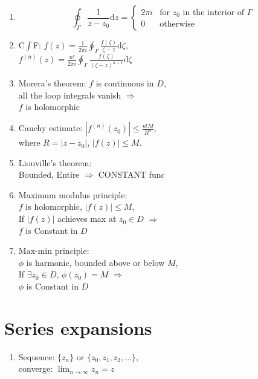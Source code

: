 \documentclass[11pt,a4paper]{article}
\begin{document}
\begin{multicols}{2}
\begin{enumerate}[resume]
\item \[
\oint_{\Gamma} \frac{1}{z-z_0} \mathrm{d}z = 
\begin{cases}
2 \pi i &\text{for } z_0 \text{ in the interior of } \Gamma \\
0 &\text{otherwise}
\end{cases}
\]

\item C$\int$F: $\displaystyle f(z) = \frac{1}{2 \pi i} \oint_{\Gamma} \frac{f(\zeta)}{\zeta-z} \mathrm{d}\zeta$, \\$\displaystyle f^{(n)}(z) = \frac{n!}{2 \pi i} \oint_{\Gamma} \frac{f(\zeta)}{(\zeta-z)^{n+1}} \mathrm{d}\zeta$

\item Morera's theorem: $f$ is continuous in $D$, \\all the loop integrals vanish $\Rightarrow$ \\ $f$ is holomorphic

\item Cauchy estimate: $\left| f^{(n)}(z_0) \right| \leq \frac{n!M}{R^n}$, \\where $R=|z-z_0|$, $|f(z)| \leq M$. 

\item Liouville's theorem: \\Bounded, Entire $\Rightarrow$ CONSTANT func

\item Maximum modulus principle: \\$f$ is holomorphic, $|f(z)| \leq M$, \\If $|f(z)|$ achieves max at $z_0 \in D$ $\Rightarrow$ \\$f$ is Constant in $D$

\item Max-min principle: \\$\phi$ is harmonic, bounded above or below $M$, \\If $\exists z_0 \in D$, $\phi(z_0) = M$ $\Rightarrow$ \\$\phi$ is Constant in $D$
\end{enumerate}

\section*{Series expansions}
\begin{enumerate}[resume]
\item Sequence: $\{z_n\}$ or $\{z_0, z_1, z_2, \ldots\}$, \\converge: $\lim_{n \to \infty} z_n = z$


\end{enumerate}
\end{multicols}
\end{document}
